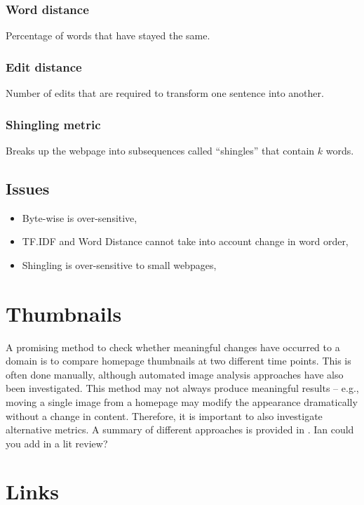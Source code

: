 \documentclass[10pt, a4paper]{article}
\begin{document}
\subsubsection*{Word distance}
Percentage of words that have stayed the same.

\subsubsection*{Edit distance}
Number of edits that are required to transform one sentence into another.

\subsubsection*{Shingling metric}
Breaks up the webpage into subsequences called ``shingles'' that contain $k$ words.

\subsection{Issues}
\begin{itemize}
	\item Byte-wise is over-sensitive,
	\item TF.IDF and Word Distance cannot take into account change in word order,
	\item Shingling is over-sensitive to small webpages,
	
\end{itemize}


\section{Thumbnails}
A promising method to check whether meaningful changes have occurred to a domain is to compare homepage thumbnails at two different time points. This is often done manually, although automated image analysis approaches have also been investigated. This method may not always produce meaningful results -- e.g., moving a single image from a homepage may modify the appearance dramatically without a change in content. Therefore, it is important to also investigate alternative metrics. A summary of different approaches is provided in \cite{kwon2006precise}. {\color{red} Ian could you add in a lit review?}

\section{Links}
\end{document}
